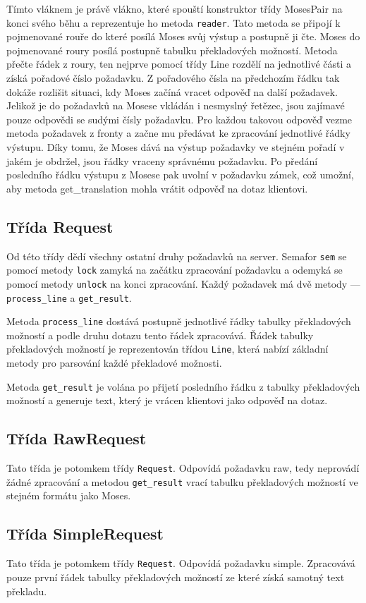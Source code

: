 \documentclass[12pt,a4paper]{report}
\begin{document}
Tímto vláknem je právě vlákno, které spouští konstruktor třídy MosesPair na konci svého běhu a reprezentuje ho metoda {\tt reader}. Tato metoda se připojí k pojmenované rouře do které posílá Moses svůj výstup a postupně ji čte. Moses do pojmenované roury posílá postupně tabulku překladových možností. Metoda přečte řádek z roury, ten nejprve pomocí třídy Line rozdělí na jednotlivé části a získá pořadové číslo požadavku. Z pořadového čísla na předchozím řádku tak dokáže rozlišit situaci, kdy Moses začíná vracet odpověď na další požadavek. Jelikož je do požadavků na Mosese vkládán i \clqq nesmyslný řetězec\crqq , jsou zajímavé pouze odpovědi se sudými čísly požadavku. Pro každou takovou odpověď vezme metoda požadavek z fronty a začne mu předávat ke zpracování jednotlivé řádky výstupu. Díky tomu, že Moses dává na výstup požadavky ve stejném pořadí v jakém je obdržel, jsou řádky vraceny správnému požadavku. Po předání posledního řádku výstupu z Mosese pak uvolní v požadavku zámek, což umožní, aby metoda get\_translation mohla vrátit odpověď na dotaz klientovi.

\subsection{Třída Request}
Od této třídy dědí všechny ostatní druhy požadavků na server. Semafor {\tt sem} se pomocí metody {\tt lock} zamyká na začátku zpracování požadavku a odemyká se pomocí metody {\tt unlock} na konci zpracování. Každý požadavek má dvě metody --- {\tt process\_line} a {\tt get\_result}.

Metoda {\tt process\_line} dostává postupně jednotlivé řádky tabulky překladových možností a podle druhu dotazu tento řádek zpracovává. Řádek tabulky překladových možností je reprezentován třídou {\tt Line}, která nabízí základní metody pro parsování každé překladové možnosti.

Metoda {\tt get\_result} je volána po přijetí posledního řádku z tabulky překladových možností a generuje text, který je vrácen klientovi jako odpověď na dotaz.

\subsection{Třída RawRequest}
Tato třída je potomkem třídy {\tt Request}. Odpovídá požadavku raw, tedy neprovádí žádné zpracování a metodou {\tt get\_result} vrací tabulku překladových možností ve stejném formátu jako Moses.

\subsection{Třída SimpleRequest}
Tato třída je potomkem třídy {\tt Request}. Odpovídá požadavku simple. Zpracovává pouze první řádek tabulky překladových možností ze které získá samotný text překladu.
\end{document}

